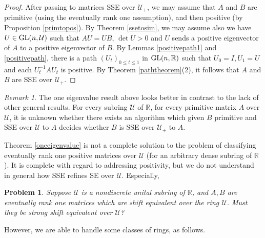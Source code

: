 \documentclass{amsart}
\newtheorem{problem}[theorem]{Problem}
\theoremstyle{definition}
\theoremstyle{remark}
\newtheorem{remark}[theorem]{Remark}
\numberwithin{equation}{section}
\begin{document}
{{\begin{proof}
After passing to matrices SSE over $\mathcal U_+$, 
we may assume that $A$ and $B$ are 
primitive (using the eventually rank one assumption),  
and then positive (by 
 Proposition \ref{primtopos}). By Theorem \ref{ssetosim}, 
we may assume also we have $U\in \textnormal{GL}(n,\mathcal U)$ 
such that $AU=UB$, $\det U>0$ and $U$ sends a positive 
eigenvector of $A$ to a positive eigenvector of $B$. 
By Lemmas \ref{positivepath1} and \ref{positivepath}, 
there is a path $( U_t)_{0\leq t\leq 1}$
in $\textnormal{GL}(n,\mathbb R)$ such that 
$U_0=I, U_1=U$ and each $U_t^{-1}AU_t$ is positive. 
By Theorem \ref{paththeorem}(2), it follows that 
$A$ and $B$ are SSE over $\mathcal U_+$. 
\end{proof} 

\begin{remark} \label{oneremark} 
The one eigenvalue result above looks better in contrast 
to the lack of other general results. 
For every subring $\mathcal U$ of $\mathbb R$, 
for every primitive matrix $A$ over $\mathcal U$, 
it is unknown whether there exists an 
algorithm which given $B$ primitive and 
SSE over $\mathcal U$ to $A$ decides whether 
$B$ is SSE over $\mathcal U_+$ to $A$. 
\end{remark}  


Theorem \ref{oneeigenvalue} is not a complete solution 
to the problem of classifying eventually rank one 
positive matrices 
over $\mathcal U$ (for an arbitrary dense subring of $\mathbb R$).
It is complete with regard to addressing positivity, but  
 we do not understand in general 
 how SSE refines SE 
over $\mathcal U$. Especially, 

\begin{problem}\label{rankonesseproblem} 
Suppose 
$\mathcal U$ is a nondiscrete unital subring of $\mathbb R$, 
 and $A,B$ are eventually rank one matrices which 
are shift equivalent  over the ring 
$\mathcal U$. Must they be strong shift equivalent over
$\mathcal U$?
\end{problem}

However, we are able to handle some classes of rings, as 
follows. 

}}
\end{document}

